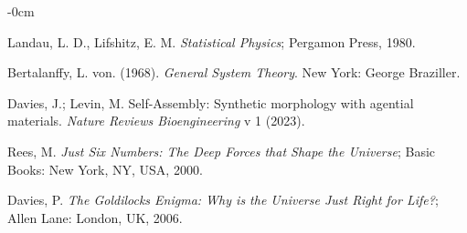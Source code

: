 \documentclass[entropy,article,submit,pdftex,moreauthors]{Definitions/mdpi}
\begin{document}
\begin{adjustwidth}{-\extralength}{0cm}
\begin{thebibliography}{999}
Landau, L. D., Lifshitz, E. M. \textit{Statistical Physics}; Pergamon Press, 1980.

Bertalanffy, L. von. (1968). \textit{General System Theory}. New York: George Braziller.

Davies, J.; Levin, M. Self-Assembly: Synthetic morphology with agential materials. \textit{Nature Reviews Bioengineering} v 1 (2023).

Rees, M. \textit{Just Six Numbers: The Deep Forces that Shape the Universe}; Basic Books: New York, NY, USA, 2000.

Davies, P. \textit{The Goldilocks Enigma: Why is the Universe Just Right for Life?}; Allen Lane: London, UK, 2006.


\end{thebibliography}

%


\PublishersNote{}
\end{adjustwidth}
\end{document}
